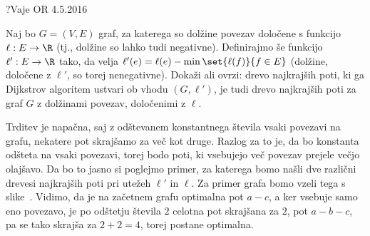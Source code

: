 \begin{naloga}{?}{Vaje OR 4.5.2016}
\begin{vprasanje}
Naj bo $G = (V, E)$ graf,
za katerega so dolžine povezav določene s funkcijo $\ell : E \to \R$
(tj., dolžine so lahko tudi negativne).
Definirajmo še funkcijo $\ell' : E \to \R$ tako,
da velja $\ell'(e) = \ell(e) - \min\set{\ell(f)}{f \in E}$
(dolžine, določene z $\ell'$, so torej nenegativne).
Dokaži ali ovrzi: drevo najkrajših poti,
ki ga Dijkstrov algoritem ustvari ob vhodu $(G, \ell')$,
je tudi drevo najkrajših poti za graf $G$ z dolžinami povezav,
določenimi z $\ell$.
\end{vprasanje}
\begin{odgovor}

Trditev je napačna, saj z odštevanem konstantnega števila vsaki povezavi na grafu, 
nekatere pot skrajšamo za več kot druge.
Razlog za to je, da bo konstanta odšteta na vsaki povezavi, 
torej bodo poti, ki vsebujejo več povezav prejele večjo olajšavo.
Da bo to jasno si poglejmo primer, 
za katerega bomo našli dve različni drevesi najkrajših poti pri utežeh $\ell'$ in $\ell$.
Za primer grafa bomo vzeli tega s slike~\fig.
Vidimo, da je na začetnem grafu optimalna pot $a-c$, a ker vsebuje samo eno povezavo, 
je po odštetju števila $2$ celotna pot skrajšana za $2$, pot $a-b-c$, 
pa se tako skrajša za $2 + 2 = 4$, torej postane optimalna.

\begin{slika}
\pgfslika
{}
\end{slika}

\end{odgovor}
\end{naloga}
